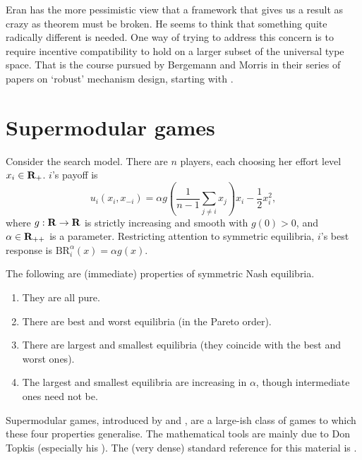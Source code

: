 \documentclass[11pt,letterpaper,reqno,oneside]{article}
\begin{document}
Eran has the more pessimistic view that a framework that gives us a result as crazy as  theorem must be broken. He seems to think that something quite radically different is needed. One way of trying to address this concern is to require incentive compatibility to hold on a larger subset of the universal type space. That is the course pursued by Bergemann and Morris in their series of papers on `robust' mechanism design, starting with \textcite{BergemannMorris2005}.



\pagebreak
\section{Supermodular games}
\label{sec:supermodular}

Consider the \textcite{Diamond1982} search model. There are $n$ players, each choosing her effort level $x_i \in \mathbf{R}_+$. $i$'s payoff is
%
\begin{equation*}
	u_i(x_i,x_{-i})
	= \alpha g\left( \frac{1}{n-1} \sum_{j \neq i} x_j \right) x_i - \frac{1}{2} x_i^2 ,
\end{equation*}
%
where $g : \mathbf{R} \to \mathbf{R}$ is strictly increasing and smooth with $g(0) > 0$, and $\alpha \in \mathbf{R}_{++}$ is a parameter. Restricting attention to symmetric equilibria, $i$'s best response is $\text{BR}_i^\alpha(x) = \alpha g(x)$.

The following are (immediate) properties of symmetric Nash equilibria.
%
\begin{enumerate}

	\item They are all pure.

	\item There are best and worst equilibria (in the Pareto order).

	\item There are largest and smallest equilibria (they coincide with the best and worst ones).

	\item The largest and smallest equilibria are increasing in $\alpha$, though intermediate ones need not be.

\end{enumerate}
%
\noindent Supermodular games, introduced by \textcite{MilgromRoberts1990ecta} and \textcite{Vives1990}, are a large-ish class of games to which these four properties generalise. The mathematical tools are mainly due to Don Topkis (especially his \citeyear{Topkis1978}). The (very dense) standard reference for this material is \textcite{Topkis1998}.
\end{document}

